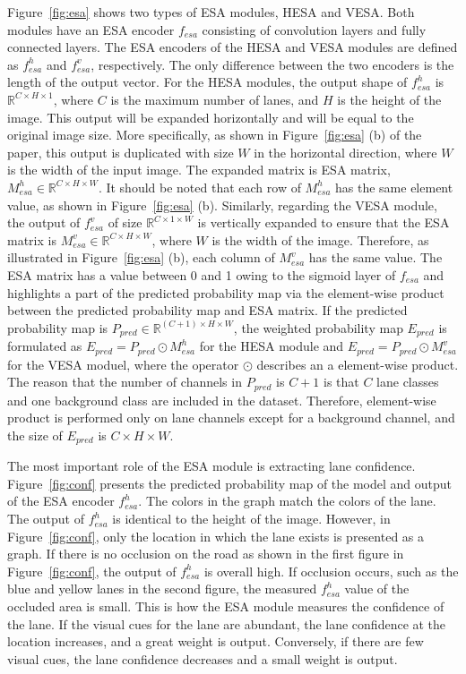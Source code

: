 \documentclass[10pt,twocolumn,letterpaper]{article}
\begin{document}
Figure~\ref{fig:esa} shows two types of ESA modules, HESA and VESA. Both modules have an ESA encoder $f_{esa}$ consisting of convolution layers and fully connected layers. The ESA encoders of the HESA and VESA modules are defined as $f^{h}_{esa}$ and $f^{v}_{esa}$, respectively. The only difference between the two encoders is the length of the output vector. For the HESA modules, the output shape of $f^{h}_{esa}$ is $\mathbb{R}^{C\times H\times 1}$, where $C$ is the maximum number of lanes, and $H$ is the height of the image. This output will be expanded horizontally and will be equal to the original image size. More specifically, as shown in Figure~\ref{fig:esa} (b) of the paper, this output is duplicated with size $W$ in the horizontal direction, where $W$ is the width of the input image. The expanded matrix is ESA matrix, $M^{h}_{esa}\in\mathbb{R}^{C\times H\times W}$. It should be noted that each row of $M^{h}_{esa}$ has the same element value, as shown in Figure~\ref{fig:esa} (b). Similarly, regarding the VESA module, the output of $f^{v}_{esa}$ of size $\mathbb{R}^{C\times 1\times W}$ is vertically expanded to ensure that the ESA matrix is $M^{v}_{esa}\in\mathbb{R}^{C\times H\times W}$, where $W$ is the width of the image. Therefore, as illustrated in Figure~\ref{fig:esa} (b), each column of $M^{v}_{esa}$ has the same value. The ESA matrix has a value between 0 and 1 owing to the sigmoid layer of $f_{esa}$ and highlights a part of the predicted probability map via the element-wise product between the predicted probability map and ESA matrix. If the predicted probability map is $P_{pred}\in\mathbb{R}^{\left(C+1\right)\times H\times W}$, the weighted probability map $E_{pred}$ is formulated as $E_{pred}=P_{pred}\odot M^{h}_{esa}$ for the HESA module and $E_{pred}=P_{pred}\odot M^{v}_{esa}$ for the VESA moduel, where the operator $\odot$ describes an a element-wise product. The reason that the number of channels in $P_{pred}$ is $C+1$ is that $C$ lane classes and one background class are included in the dataset. Therefore, element-wise product is performed only on lane channels except for a background channel, and the size of $E_{pred}$ is $C\times H\times W$.

The most important role of the ESA module is extracting lane confidence. Figure~\ref{fig:conf} presents the predicted probability map of the model and output of the ESA encoder $f^{h}_{esa}$. The colors in the graph match the colors of the lane. The output of $f^{h}_{esa}$ is identical to the height of the image. However, in Figure~\ref{fig:conf}, only the location in which the lane exists is presented as a graph. If there is no occlusion on the road as shown in the first figure in Figure~\ref{fig:conf}, the output of $f^{h}_{esa}$ is overall high. If occlusion occurs, such as the blue and yellow lanes in the second figure, the measured $f^{h}_{esa}$ value of the occluded area is small. This is how the ESA module measures the confidence of the lane. If the visual cues for the lane are abundant, the lane confidence at the location increases, and a great weight is output. Conversely, if there are few visual cues, the lane confidence decreases and a small weight is output.
\end{document}
